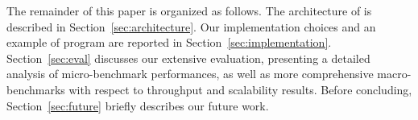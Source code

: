 The remainder of this paper is organized as follows.
The architecture of \SYS{} is described in Section~\ref{sec:architecture}.
Our implementation choices and an example of \SYS{} program are reported in Section~\ref{sec:implementation}.
Section~\ref{sec:eval} discusses our extensive evaluation, presenting a detailed analysis of micro-benchmark performances, as well as more comprehensive macro-benchmarks with respect to throughput and scalability results.
Before concluding, Section~\ref{sec:future} briefly describes our future work.
